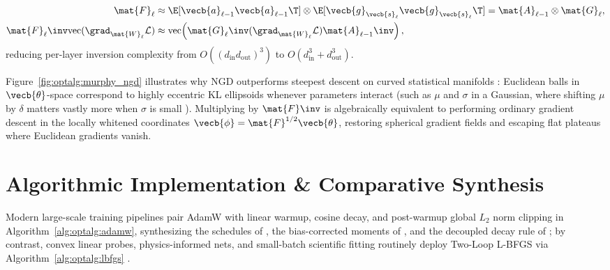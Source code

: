 \documentclass[../../../../master.tex]{subfiles}
\begin{document}
\begin{coremath}
\begin{enumerate}
  \begin{equation}
  \label{eq:optalg:kfac}
  \begin{aligned}
    \mat{F}_\ell &\approx \E[\vecb{a}_{\ell-1}\vecb{a}_{\ell-1}\T] \otimes \E[\vecb{g}_{\vecb{s}_\ell}\vecb{g}_{\vecb{s}_\ell}\T] = \mat{A}_{\ell-1} \otimes \mat{G}_\ell, \\
    \mat{F}_\ell\inv \mathrm{vec}(\grad_{\mat{W}_\ell}\mathcal{L}) &\approx \mathrm{vec}\!\left(\mat{G}_\ell\inv (\grad_{\mat{W}_\ell}\mathcal{L}) \mat{A}_{\ell-1}\inv\right),
  \end{aligned}
  \end{equation}
  reducing per-layer inversion complexity from $O((d_{\mathrm{in}}d_{\mathrm{out}})^3)$ to $O(d_{\mathrm{in}}^3 + d_{\mathrm{out}}^3)$.
\end{enumerate}
\end{coremath}

\begin{intuition}
Figure~\ref{fig:optalg:murphy_ngd} illustrates why NGD outperforms steepest descent on curved statistical manifolds : Euclidean balls in $\vecb{\theta}$-space correspond to highly eccentric KL ellipsoids whenever parameters interact (such as $\mu$ and $\sigma$ in a Gaussian, where shifting $\mu$ by $\delta$ matters vastly more when $\sigma$ is small ). Multiplying by $\mat{F}\inv$ is algebraically equivalent to performing ordinary gradient descent in the locally whitened coordinates $\vecb{\phi} = \mat{F}^{1/2}\vecb{\theta}$, restoring spherical gradient fields and escaping flat plateaus where Euclidean gradients vanish.
\end{intuition}

\section{Algorithmic Implementation \& Comparative Synthesis}
\label{sec:optalg:algorithms}

Modern large-scale training pipelines pair AdamW with linear warmup, cosine decay, and post-warmup global $L_2$ norm clipping in Algorithm~\ref{alg:optalg:adamw}, synthesizing the schedules of , the bias-corrected moments of , and the decoupled decay rule of ; by contrast, convex linear probes, physics-informed nets, and small-batch scientific fitting routinely deploy Two-Loop L-BFGS via Algorithm~\ref{alg:optalg:lbfgs} .
\end{document}
